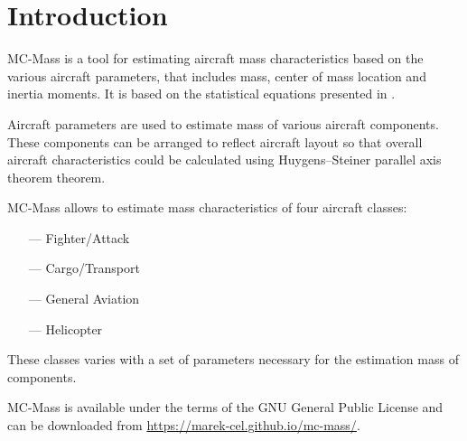 \chapter{Introduction}

MC-Mass is a tool for estimating aircraft mass characteristics based on the various aircraft parameters, that includes mass, center of mass location and inertia moments. It is based on the statistical equations presented in \cite{Raymer2018,NASA-TP-2015-218751}.

Aircraft parameters are used to estimate mass of various aircraft components. These components can be arranged to reflect aircraft layout so that overall aircraft characteristics could be calculated using Huygens–Steiner parallel axis theorem theorem.

MC-Mass allows to estimate mass characteristics of four aircraft classes:
\begin{itemize}
  \item[---] Fighter/Attack
  \item[---] Cargo/Transport
  \item[---] General Aviation
  \item[---] Helicopter
\end{itemize}

These classes varies with a set of parameters necessary for the estimation mass of components.

MC-Mass is available under the terms of the GNU General Public License \cite{GNU-GPLv3} and can be downloaded from \url{https://marek-cel.github.io/mc-mass/}.
